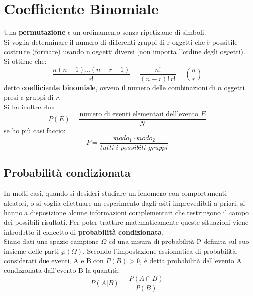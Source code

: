 \documentclass[a4paper,12pt, oneside]{book}
\begin{document}
\section{Coefficiente Binomiale}
Una \textbf{permutazione} è un ordinamento senza ripetizione di simboli.\\
Si voglia determinare il numero di differenti gruppi di r oggetti che è possibile costruire
(formare) usando n oggetti diversi (non importa l’ordine degli oggetti). Si ottiene che:
\[\frac{n(n-1)...(n-r+1)}{r!}=\frac{n!}{(n-r)!\,r!}= {n\choose r}\]
detto \textbf{coefficiente binomiale}, ovvero il numero delle combinazioni di $n$ oggetti presi a gruppi di $r$.\\
Si ha inoltre che:
\[P(E)=\frac{\mbox{numero di eventi elementari dell'evento }E}{N}\]
se ho più casi faccio:
\[P=\frac{modo_1\cdot modo_2}{tutti\,\, i\,\, possibili\,\, gruppi}\]

\subsection{Probabilità condizionata}
In molti casi, quando si desideri studiare un fenomeno con comportamenti
aleatori, o si voglia effettuare un esperimento dagli esiti imprevedibili a priori, si
hanno a disposizione alcune informazioni complementari che restringono il campo dei possibili risultati.
Per poter trattare matematicamente queste situazioni viene introdotto il concetto di\textbf{ probabilità condizionata}.\\
Siano dati uno spazio campione $\Omega$ ed una misura di probabilità P definita sul suo
insieme delle parti $\wp(\Omega)$.  Secondo l’impostazione assiomatica di probabilità, considerati due eventi, A e B con
$P(B)>0$, è detta probabilità dell'evento A condizionata dall'evento B la quantità:
\[P(A|B)=\frac{P(A\cap B)}{P(B)}\]
\end{document}
